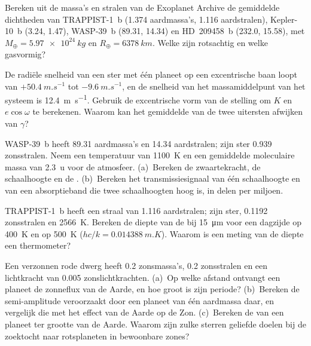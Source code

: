 \begin{exercise}[$\star\star$]\label{exo:b3:exoplanets:6}
Bereken uit de massa's en stralen van de Exoplanet Archive de gemiddelde
dichtheden van TRAPPIST-1~b (1.374 aardmassa's, 1.116 aardstralen),
Kepler-10~b (3.24, 1.47), WASP-39~b (89.31, 14.34) en HD~209458~b (232.0,
15.58), met $M_\oplus = \qty{5.97e24}{kg}$ en $R_\oplus =
\qty{6378}{km}$. Welke zijn rotsachtig en welke gasvormig?
\end{exercise}

\begin{exercise}[$\star\star$]\label{exo:b3:exoplanets:7}
De radiële snelheid van een ster met één planeet op een excentrische baan
loopt van $+\qty{50.4}{m.s^{-1}}$ tot $-\qty{9.6}{m.s^{-1}}$, en de
snelheid van het massamiddelpunt van het systeem is \qty{12.4}{m.s^{-1}}. Gebruik de
excentrische vorm van de stelling om $K$ en $e\cos\omega$ te berekenen. Waarom kan het
gemiddelde van de twee uitersten afwijken van $\gamma$?
\end{exercise}

\begin{exercise}[$\star\star$]\label{exo:b3:exoplanets:8}
WASP-39~b heeft 89.31 aardmassa's en 14.34 aardstralen; zijn ster 0.939
zonsstralen. Neem een temperatuur van \qty{1100}{K} en een gemiddelde moleculaire
massa van \qty{2.3}{u} voor de atmosfeer. (a)~Bereken de zwaartekracht, de
schaalhoogte en de . (b)~Bereken het transmissiesignaal van
één schaalhoogte en van een absorptieband die twee schaalhoogten hoog is, in
delen per miljoen.
\end{exercise}

\begin{exercise}[$\star\star$]\label{exo:b3:exoplanets:9}
TRAPPIST-1~b heeft een straal van 1.116 aardstralen; zijn ster, 0.1192
zonsstralen en \qty{2566}{K}. Bereken de diepte van de  bij
\qty{15}{\micro m} voor een dagzijde op \qty{400}{K} en op \qty{500}{K}
($hc/k = \qty{0.014388}{m.K}$). Waarom is een meting van de diepte een
thermometer?
\end{exercise}

\begin{exercise}[$\star\star\star$]\label{exo:b3:exoplanets:10}
Een verzonnen rode dwerg heeft 0.2 zonsmassa's, 0.2 zonsstralen en een
lichtkracht van \num{0.005} zonslichtkrachten. (a)~Op welke afstand ontvangt een
planeet de zonneflux van de Aarde, en hoe groot is zijn periode?
(b)~Bereken de semi-amplitude veroorzaakt door een planeet van één aardmassa
daar, en vergelijk die met het effect van de Aarde op de Zon. (c)~Bereken de
 van een planeet ter grootte van de Aarde. Waarom zijn zulke sterren
geliefde doelen bij de zoektocht naar rotsplaneten in bewoonbare zones?
\end{exercise}

